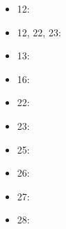 \documentclass{ifacconf}
\begin{document}
\begin{itemize}
  \item 12: \cite{bi:12}
  \item 12, 22, 23: \cite{bi:12,bi:22,bi:23}
  \item 13: \cite{bi:13}
  \item 16: \cite{bi:16}
  \item 22: \cite{bi:22}
  \item 23: \cite{bi:23}
  \item 25: \cite{bi:25}
  \item 26: \cite{bi:26}
  \item 27: \cite{bi:27}
  \item 28: \cite{bi:28}
\end{itemize}
  
\end{document}
